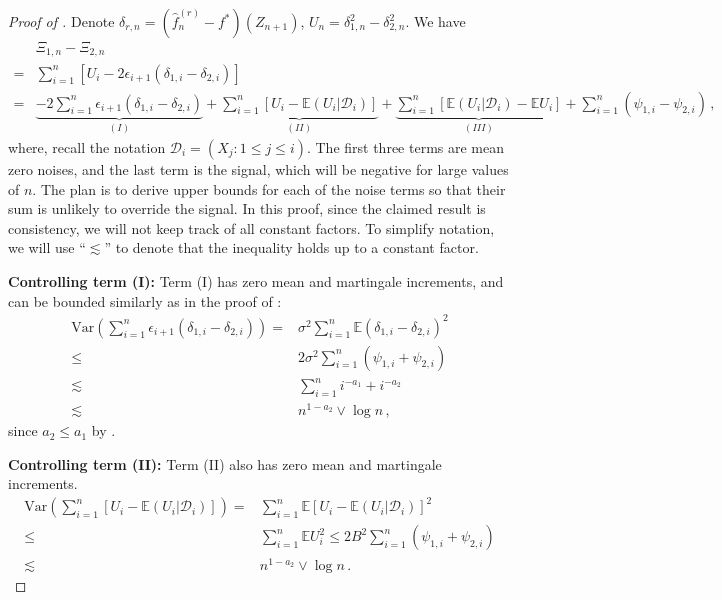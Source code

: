 \documentclass[11pt]{article}
\theoremstyle{plain}
\newcommand{\D}{{\mathcal{D}}}
\newcommand{\var}{\mathrm{Var}}
\begin{document}
\begin{proof}[Proof of ]
Denote $\delta_{r,n}=(\hat f^{(r)}_n-f^*)(Z_{n+1})$, $U_n=\delta_{1,n}^2-\delta_{2,n}^2$. We have
\begin{align*}
&\Xi_{1,n}-\Xi_{2,n}\\=&\sum_{i=1}^n\left[ U_i-2\epsilon_{i+1}(\delta_{1,i}-\delta_{2,i})\right]\\
=& \underbrace{-2\sum_{i=1}^n \epsilon_{i+1}(\delta_{1,i}-\delta_{2,i})}_{(I)}+\underbrace{\sum_{i=1}^n\left[ U_i-\mathbb E(U_i|\D_{i})\right]}_{(II)}+\underbrace{\sum_{i=1}^n\left[\mathbb E(U_i|\D_{i}) - \mathbb E U_i\right]}_{(III)}+\sum_{i=1}^n (\psi_{1,i}-\psi_{2,i})\,,
\end{align*}
where, recall the notation $\D_i=(X_j:1\le j\le i)$.
The first three terms are mean zero noises, and the last term is the signal, which will be negative for large values of $n$.  The plan is to derive upper bounds for each of the noise terms so that their sum is unlikely to override the signal.  In this proof, since the claimed result is consistency, we will not keep track of all constant factors. To simplify notation, we will use ``$\lesssim$'' to denote that the inequality holds up to a constant factor.

\textbf{Controlling term (I):} Term (I) has zero mean and martingale increments, and can be bounded similarly as in the proof of :
\begin{align*}
    \var\left(\sum_{i=1}^n\epsilon_{i+1}(\delta_{1,i}-\delta_{2,i})\right)=&\sigma^2\sum_{i=1}^n\mathbb E (\delta_{1,i}-\delta_{2,i})^2\\
    \le & 2\sigma^2 \sum_{i=1}^n (\psi_{1,i}+\psi_{2,i})\\
     \lesssim & \sum_{i=1}^n i^{-a_1}+i^{-a_2}\\
     \lesssim & n^{1-a_2}\vee\log n\,,
\end{align*}
since $a_2\le a_1$ by .

\textbf{Controlling term (II):} Term (II) also has zero mean and martingale increments.
\begin{align*}
\var\left(\sum_{i=1}^n\left[ U_i-\mathbb E(U_i|\D_{i})\right]\right)=&\sum_{i=1}^n \mathbb E\left[ U_i-\mathbb E(U_i|\D_{i})\right]^2\\
\le & \sum_{i=1}^n \mathbb E U_i^2\le 2B^2\sum_{i=1}^n(\psi_{1,i}+\psi_{2,i})\\
\lesssim & n^{1-a_2}\vee \log n\,.
\end{align*}


\end{proof}
\end{document}
